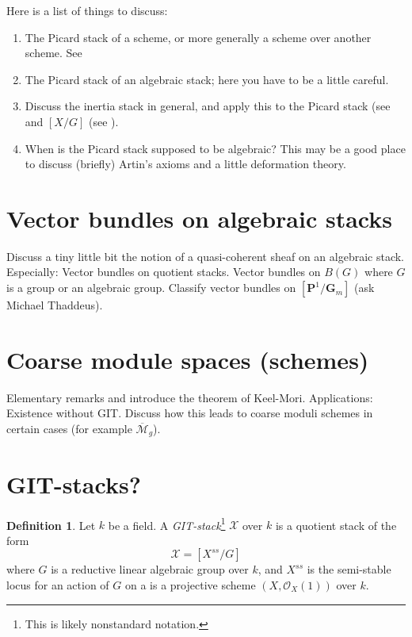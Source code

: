 \documentclass{amsart}
\theoremstyle{plain}
\theoremstyle{definition}
\newtheorem{definition}[subsection]{Definition}
\theoremstyle{remark}
\numberwithin{equation}{subsection}
\begin{document}
\noindent
Here is a list of things to discuss:
\begin{enumerate}
\item The Picard stack of a scheme, or more generally a scheme over
another scheme. See
\cite[Example \href{http://math.columbia.edu/algebraic_geometry/%
stacks-git/locate.php?tag=0372}{0372}]{stacks-project}
\item The Picard stack of an algebraic stack;
here you have to be a little careful.
\item Discuss the inertia stack in general, and apply this to
the Picard stack (see
\cite[Example \href{http://math.columbia.edu/algebraic_geometry/%
stacks-git/locate.php?tag=0375}{0375}]{stacks-project} and
$[X/G]$ (see \cite[Example \href{http://math.columbia.edu/algebraic_geometry/%
stacks-git/locate.php?tag=0374}{0374}]{stacks-project}).
\item When is the Picard stack supposed to be algebraic? This may be a good
place to discuss (briefly) Artin's axioms and a little deformation theory.
\end{enumerate}

\section{Vector bundles on algebraic stacks}
\label{section-vectorbundles}

\noindent
Discuss a tiny little bit the notion of a quasi-coherent sheaf on
an algebraic stack. Especially: Vector bundles on quotient stacks.
Vector bundles on $B(G)$ where $G$ is a group or an algebraic group.
Classify vector bundles on $[\mathbf{P}^1/\mathbf{G}_m]$
(ask Michael Thaddeus).


\section{Coarse module spaces (schemes)}
\label{section-coarse}

\noindent
Elementary remarks and introduce the theorem of Keel-Mori.
Applications: Existence without GIT. Discuss how this leads to
coarse moduli schemes in certain cases (for example
$\overline{\mathcal{M}}_g$).


\section{GIT-stacks?}
\label{section-GIT}

\begin{definition}
\label{definition-GIT-stack}
Let $k$ be a field.
A {\it GIT-stack}\footnote{This is likely nonstandard notation.}
$\mathcal{X}$ over $k$ is a quotient stack of the form
$$
\mathcal{X} = [X^{ss}/G]
$$
where $G$ is a reductive linear algebraic group over $k$,
and $X^{ss}$ is the semi-stable locus for an action of $G$ on
a is a projective scheme $(X, \mathcal{O}_X(1))$ over $k$.
\end{definition}
\end{document}

